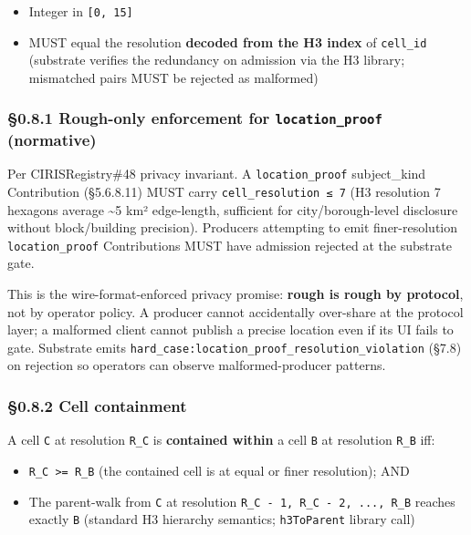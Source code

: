 \documentclass[10pt]{article}
\begin{document}
\begin{itemize}\setlength\itemsep{0pt}
\item Integer in \texttt{[0, 15]}
\item MUST equal the resolution \textbf{decoded from the H3 index} of \texttt{cell\_id} (substrate verifies the redundancy on admission via the H3 library; mismatched pairs MUST be rejected as malformed)
\end{itemize}


\subsubsection*{§0.8.1 Rough-only enforcement for \texttt{location\_proof} (normative)}


Per CIRISRegistry\#48 privacy invariant. A \texttt{location\_proof} subject\_kind Contribution (§5.6.8.11) MUST carry \texttt{cell\_resolution ≤ 7} (H3 resolution 7 hexagons average \textasciitilde{}5 km² edge-length, sufficient for city/borough-level disclosure without block/building precision). Producers attempting to emit finer-resolution \texttt{location\_proof} Contributions MUST have admission rejected at the substrate gate.


This is the wire-format-enforced privacy promise: \textbf{rough is rough by protocol}, not by operator policy. A producer cannot accidentally over-share at the protocol layer; a malformed client cannot publish a precise location even if its UI fails to gate. Substrate emits \texttt{hard\_case:location\_proof\_resolution\_violation} (§7.8) on rejection so operators can observe malformed-producer patterns.


\subsubsection*{§0.8.2 Cell containment}


A cell \texttt{C} at resolution \texttt{R\_C} is \textbf{contained within} a cell \texttt{B} at resolution \texttt{R\_B} iff:


\begin{itemize}\setlength\itemsep{0pt}
\item \texttt{R\_C >= R\_B} (the contained cell is at equal or finer resolution); AND
\item The parent-walk from \texttt{C} at resolution \texttt{R\_C - 1, R\_C - 2, ..., R\_B} reaches exactly \texttt{B} (standard H3 hierarchy semantics; \texttt{h3ToParent} library call)
\end{itemize}
\end{document}
